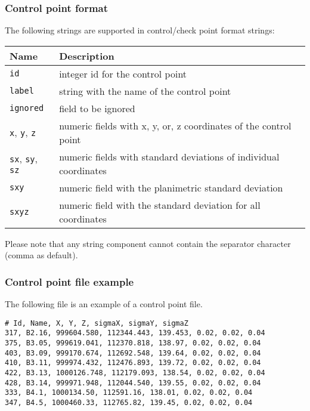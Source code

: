 \documentclass{article}
\begin{document}
\subsubsection{Control point format}
\label{sec:ctrlFormat}
The following strings are supported in control/check point format
strings:
\begin{center}
\begin{tabular}{l|l}
Name & Description\\
\hline
\texttt{id} & integer id for the control point\\
\texttt{label} & string with the name of the control point\\
\texttt{ignored} & field to be ignored\\
\texttt{x}, \texttt{y}, \texttt{z} & numeric fields with x, y, or, z coordinates of the control point\\
\texttt{sx}, \texttt{sy}, \texttt{sz} & numeric fields with standard deviations of individual coordinates\\
\texttt{sxy} & numeric field with the planimetric standard deviation\\
\texttt{sxyz} & numeric field with the standard deviation for all coordinates\\
\end{tabular}
\end{center}
Please note that any string component cannot contain the separator
character (comma as default).
\subsubsection{Control point file example}
\label{sec:ctrlExample}
The following file is an example of a control point file.
\begin{verbatim}
# Id, Name, X, Y, Z, sigmaX, sigmaY, sigmaZ
317, B2.16, 999604.580, 112344.443, 139.453, 0.02, 0.02, 0.04
375, B3.05, 999619.041, 112370.818, 138.97, 0.02, 0.02, 0.04
403, B3.09, 999170.674, 112692.548, 139.64, 0.02, 0.02, 0.04
410, B3.11, 999974.432, 112476.893, 139.72, 0.02, 0.02, 0.04
422, B3.13, 1000126.748, 112179.093, 138.54, 0.02, 0.02, 0.04
428, B3.14, 999971.948, 112044.540, 139.55, 0.02, 0.02, 0.04
333, B4.1, 1000134.50, 112591.16, 138.01, 0.02, 0.02, 0.04
347, B4.5, 1000460.33, 112765.82, 139.45, 0.02, 0.02, 0.04
\end{verbatim}
\end{document}
